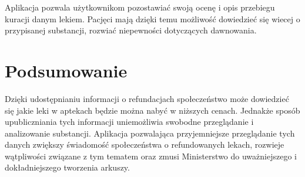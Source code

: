 \documentclass{article}
\begin{document}
Aplikacja pozwala użytkownikom pozostawiać swoją ocenę i opis przebiegu kuracji danym lekiem. Pacjęci mają dzięki temu możliwość dowiedzieć się wiecej o przypisanej substancji, rozwiać niepewności dotyczących dawnowania.


\section{Podsumowanie}

Dzięki udostępnianiu informacji o refundacjach społeczeństwo może dowiedzieć się jakie leki w aptekach będzie można nabyć w niższych cenach. Jednakże sposób upubliczniania tych informacji uniemożliwia swobodne przeglądanie i analizowanie substancji. Aplikacja pozwalająca przyjemniejsze przeglądanie tych danych zwiększy świadomość społeczeństwa o refundowanych lekach, rozwieje wątpliwości związane z tym tematem oraz zmusi Ministerstwo do uważniejszego i dokładniejszego tworzenia arkuszy.
\end{document}
